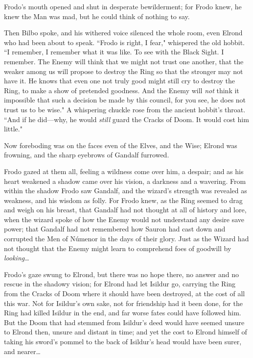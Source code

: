 Frodo's mouth opened and shut in desperate bewilderment; for Frodo knew, he knew the Man was mad, but he could think of nothing to say.

Then Bilbo spoke, and his withered voice silenced the whole room, even Elrond who had been about to speak. ``Frodo is right, I fear," whispered the old hobbit. ``I remember, I remember what it was like. To see with the Black Sight. I remember. The Enemy will think that we might not trust one another, that the weaker among us will propose to destroy the Ring so that the stronger may not have it. He knows that even one not truly good might still cry to destroy the Ring, to make a show of pretended goodness. And the Enemy will \emph{not} think it impossible that such a decision be made by this council, for you see, he does not trust us to be wise." A whispering chuckle rose from the ancient hobbit's throat. ``And if he did—why, he would \emph{still} guard the Cracks of Doom. It would cost him little."

Now foreboding was on the faces even of the Elves, and the Wise; Elrond was frowning, and the sharp eyebrows of Gandalf furrowed.

Frodo gazed at them all, feeling a wildness come over him, a despair; and as his heart weakened a shadow came over his vision, a darkness and a wavering. From within the shadow Frodo saw Gandalf, and the wizard's strength was revealed as weakness, and his wisdom as folly. For Frodo knew, as the Ring seemed to drag and weigh on his breast, that Gandalf had not thought at all of history and lore, when the wizard spoke of how the Enemy would not understand any desire save power; that Gandalf had not remembered how Sauron had cast down and corrupted the Men of Númenor in the days of their glory. Just as the Wizard had not thought that the Enemy might learn to comprehend foes of goodwill by \emph{looking{\ldots}}

Frodo's gaze swung to Elrond, but there was no hope there, no answer and no rescue in the shadowy vision; for Elrond had let Isildur go, carrying the Ring from the Cracks of Doom where it should have been destroyed, at the cost of all this war. Not for Isildur's own sake, not for friendship had it been done, for the Ring had killed Isildur in the end, and far worse fates could have followed him. But the Doom that had stemmed from Isildur's deed would have seemed unsure to Elrond then, unsure and distant in time; and yet the cost to Elrond himself of taking his sword's pommel to the back of Isildur's head would have been surer, and nearer{\ldots}

